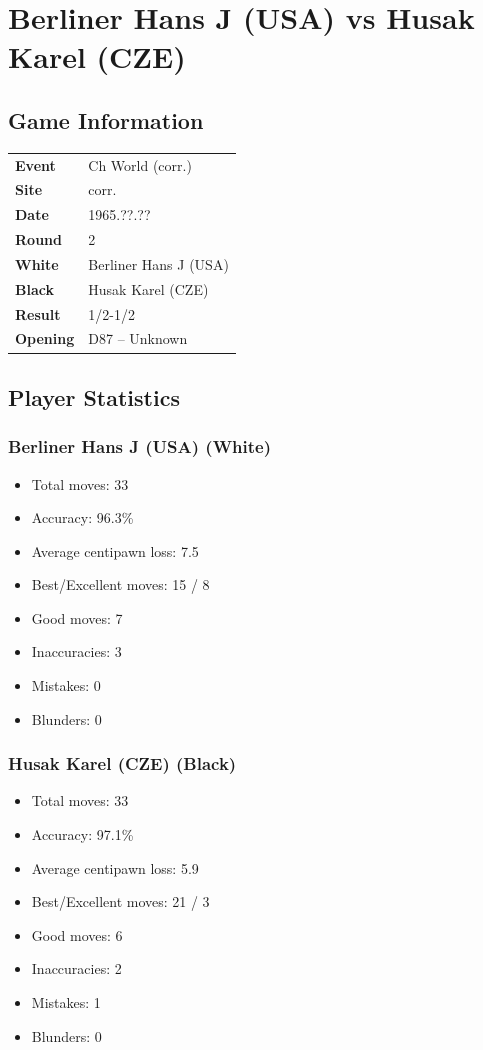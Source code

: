 \documentclass[11pt]{book}
\begin{document}
\chapter{Berliner Hans J (USA) vs Husak Karel (CZE)}

\section{Game Information}
\begin{tabular}{ll}
\textbf{Event} & Ch World (corr.) \\
\textbf{Site} & corr. \\
\textbf{Date} & 1965.??.?? \\
\textbf{Round} & 2 \\
\textbf{White} & Berliner Hans J (USA) \\
\textbf{Black} & Husak Karel (CZE) \\
\textbf{Result} & 1/2-1/2 \\
\textbf{Opening} & D87 -- Unknown \\
\end{tabular}

\section{Player Statistics}

\subsection{Berliner Hans J (USA) (White)}
\begin{itemize}
\item Total moves: 33
\item Accuracy: 96.3\%
\item Average centipawn loss: 7.5
\item Best/Excellent moves: 15 / 8
\item Good moves: 7
\item Inaccuracies: 3
\item Mistakes: 0
\item Blunders: 0
\end{itemize}

\subsection{Husak Karel (CZE) (Black)}
\begin{itemize}
\item Total moves: 33
\item Accuracy: 97.1\%
\item Average centipawn loss: 5.9
\item Best/Excellent moves: 21 / 3
\item Good moves: 6
\item Inaccuracies: 2
\item Mistakes: 1
\item Blunders: 0
\end{itemize}
\end{document}
